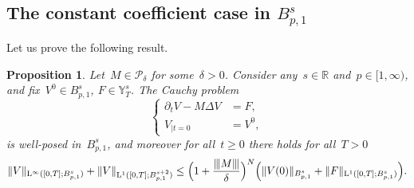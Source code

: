 \documentclass[JEP,XML,SOM,Unicode,published]{cedram}
\newtheorem{prop}{Proposition}[section]
\theoremstyle{definition}
\newcommand\R{\mathbb{R}}
\renewcommand\L{\mathrm{L}}
\newcommand{\vertiii}[1]{{\vert\kern-0.08em\vert\kern-0.08em\vert #1 \vert\kern-0.08em\vert\kern-0.08em\vert}}
\begin{document}
\subsection{The constant coefficient case in $B^s_{p,1}$}
Let us prove the following result.
\begin{prop}\label{prop:systlinbesov}
Let~$M\in\mathscr{P}_\delta$ for some~$\delta>0$. Consider any~$s \in \R$ and~$p \in [1,\infty)$, and fix~$V^0\in B^s_{p,1}$, $F\in {\mathbb Y}_T^{s}$. The Cauchy problem
\[
\left\{
\begin{aligned}
\partial_t V-M \Delta V &= F,\\
V_{|t=0} &= V^0,
\end{aligned}
\right.
\]
is well-posed in~$B^s_{p,1}$, and moreover for all~$t \geq 0$ there holds for all~$T>0$
\[
\| V \|_{\L^\infty([0,T];B^s_{p,1})} + \| V \|_{\L^1([0,T];B^{s+2}_{p,1})} \leq \Bigl(1+ \frac{ \vertiii{M}}{\delta}\Bigr)^N\Bigl(\| V (0)\|_{B^s_{p,1}} + \| F \|_{\L^1([0,T];B^s_{p,1})} \Bigr).
\]
\end{prop}
\end{document}
